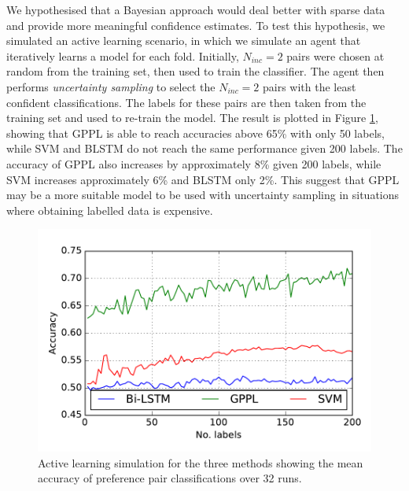 We hypothesised that a Bayesian approach would deal better with sparse data and provide more meaningful confidence estimates. To test this hypothesis, we simulated an active learning scenario, in which we simulate an agent that
iteratively learns a model for each fold. Initially, $N_{inc}=2$ pairs were chosen at random from the training set,
then used to train the classifier. The agent then performs \emph{uncertainty sampling} to select the $N_{inc}=2$
 pairs with the least confident classifications. The labels for these pairs are then taken from the training set and 
used to re-train the model. The result is plotted in Figure \ref{fig:active_learning}, showing that GPPL
is able to reach accuracies above 65\% with only 50 labels, while SVM and BLSTM do not reach the same performance
given 200 labels. The accuracy of GPPL also increases by approximately 8\% given 200 labels, while SVM increases
approximately 6\% and BLSTM only 2\%. This suggest that GPPL may be a more suitable model to be used with
uncertainty sampling in situations where obtaining labelled data is expensive.
\begin{figure}
\includegraphics[width=1.0\columnwidth,trim=0 0 0 22,clip=true]{figures/active_learning/test_acc}
\caption{Active learning simulation for the three methods showing the mean accuracy of preference pair classifications over 32 runs.}
\label{fig:active_learning}
\end{figure}


